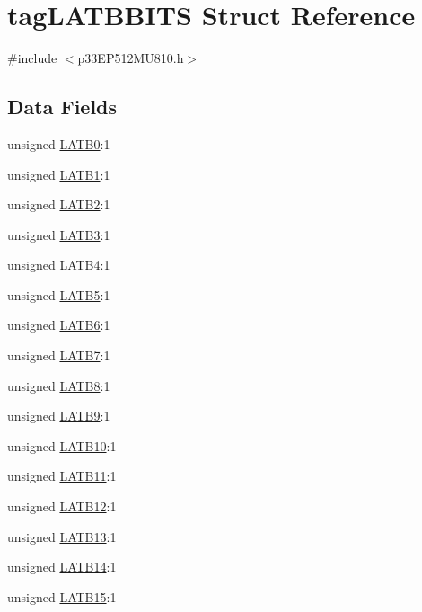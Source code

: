 \hypertarget{structtag_l_a_t_b_b_i_t_s}{}\section{tag\+L\+A\+T\+B\+B\+I\+TS Struct Reference}
\label{structtag_l_a_t_b_b_i_t_s}


{\ttfamily \#include $<$p33\+E\+P512\+M\+U810.\+h$>$}

\subsection*{Data Fields}
\begin{DoxyCompactItemize}
\item 
unsigned \hyperlink{structtag_l_a_t_b_b_i_t_s_ad317da92846674694a76e7aae18614c0}{L\+A\+T\+B0}\+:1
\item 
unsigned \hyperlink{structtag_l_a_t_b_b_i_t_s_a857c4a989abd018efdba6755620c4e6a}{L\+A\+T\+B1}\+:1
\item 
unsigned \hyperlink{structtag_l_a_t_b_b_i_t_s_ab335d78b25b0a596f6f46daef1072f7f}{L\+A\+T\+B2}\+:1
\item 
unsigned \hyperlink{structtag_l_a_t_b_b_i_t_s_a6cd30f61f89a47fbbb9dc81d11448980}{L\+A\+T\+B3}\+:1
\item 
unsigned \hyperlink{structtag_l_a_t_b_b_i_t_s_a93b440c2c06c0bc97f2957f42ffaea29}{L\+A\+T\+B4}\+:1
\item 
unsigned \hyperlink{structtag_l_a_t_b_b_i_t_s_a501d0e6c952110b2b74aa37454736a8e}{L\+A\+T\+B5}\+:1
\item 
unsigned \hyperlink{structtag_l_a_t_b_b_i_t_s_a133ff1dad08c9cbfb6bccd0606076c6c}{L\+A\+T\+B6}\+:1
\item 
unsigned \hyperlink{structtag_l_a_t_b_b_i_t_s_aa052465171c5de5210a8cf1a2cb7fd91}{L\+A\+T\+B7}\+:1
\item 
unsigned \hyperlink{structtag_l_a_t_b_b_i_t_s_a6798ae40359a5a4891be047d25f7957b}{L\+A\+T\+B8}\+:1
\item 
unsigned \hyperlink{structtag_l_a_t_b_b_i_t_s_ac3e16d6704a2e96592d8764e96c46839}{L\+A\+T\+B9}\+:1
\item 
unsigned \hyperlink{structtag_l_a_t_b_b_i_t_s_a1a3e0652d91c5d4357954cea23149ce0}{L\+A\+T\+B10}\+:1
\item 
unsigned \hyperlink{structtag_l_a_t_b_b_i_t_s_acb50cc2beabf03648296785e9c10fadc}{L\+A\+T\+B11}\+:1
\item 
unsigned \hyperlink{structtag_l_a_t_b_b_i_t_s_ab80172a24de1b5bcfc5bd42b4d6d7096}{L\+A\+T\+B12}\+:1
\item 
unsigned \hyperlink{structtag_l_a_t_b_b_i_t_s_ad728ad54b068affa8349f6ab5c397570}{L\+A\+T\+B13}\+:1
\item 
unsigned \hyperlink{structtag_l_a_t_b_b_i_t_s_a7425810a59d2c6e61210fd2ee2fea81b}{L\+A\+T\+B14}\+:1
\item 
unsigned \hyperlink{structtag_l_a_t_b_b_i_t_s_a01e451e66d1b558c3d173618e3c6519b}{L\+A\+T\+B15}\+:1
\end{DoxyCompactItemize}


